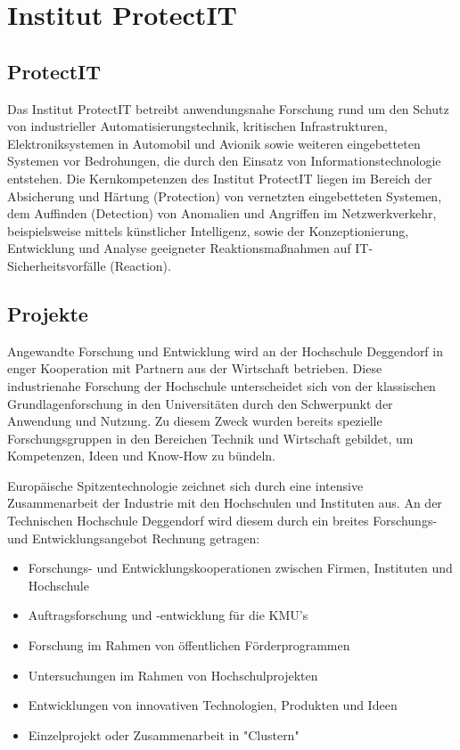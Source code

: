 \chapter{Institut ProtectIT}
\section{ProtectIT}
Das Institut ProtectIT betreibt anwendungsnahe Forschung rund um den Schutz von industrieller Automatisierungstechnik, kritischen Infrastrukturen, Elektroniksystemen in Automobil und Avionik sowie weiteren eingebetteten Systemen vor Bedrohungen, die durch den Einsatz von Informationstechnologie entstehen. 
Die Kernkompetenzen des Institut ProtectIT liegen im Bereich der Absicherung und Härtung (Protection) von vernetzten eingebetteten Systemen, dem Auffinden (Detection) von Anomalien und Angriffen im Netzwerkverkehr, beispielsweise mittels künstlicher Intelligenz, sowie der Konzeptionierung, Entwicklung und Analyse geeigneter Reaktionsmaßnahmen auf IT-Sicherheitsvorfälle (Reaction).

\section{Projekte}
Angewandte Forschung und Entwicklung wird an der Hochschule Deggendorf in enger Kooperation mit Partnern aus der Wirtschaft betrieben. Diese industrienahe Forschung der Hochschule unterscheidet sich von der klassischen Grundlagenforschung in den Universitäten durch den Schwerpunkt der Anwendung und Nutzung. Zu diesem Zweck wurden bereits spezielle Forschungsgruppen in den Bereichen Technik und Wirtschaft gebildet, um Kompetenzen, Ideen und Know-How zu bündeln.

Europäische Spitzentechnologie zeichnet sich durch eine intensive Zusammenarbeit der Industrie mit den Hochschulen und Instituten aus. An der Technischen Hochschule Deggendorf wird diesem durch ein breites Forschungs- und Entwicklungsangebot Rechnung getragen:
\begin{itemize}
    \item Forschungs- und Entwicklungskooperationen zwischen Firmen, Instituten und Hochschule
    \item Auftragsforschung und -entwicklung für die KMU's
    \item Forschung im Rahmen von öffentlichen Förderprogrammen
    \item Untersuchungen im Rahmen von Hochschulprojekten
    \item Entwicklungen von innovativen Technologien, Produkten und Ideen
    \item Einzelprojekt oder Zusammenarbeit in "Clustern"
\end{itemize}

\newpage

